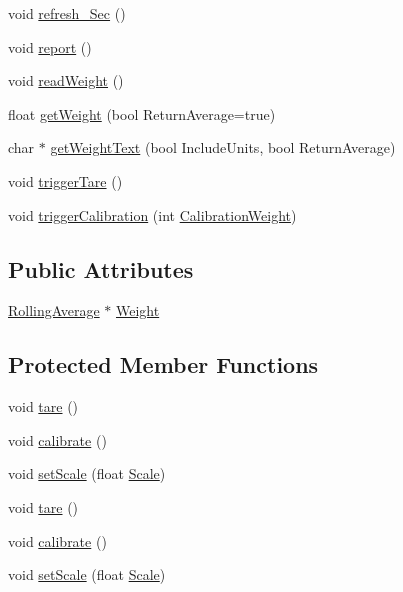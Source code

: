 \begin{DoxyCompactItemize}
\item 
void \hyperlink{class_weight_sensor_a6f7c6cab318b6677e43b7deb9e0b5fee}{refresh\+\_\+\+Sec} ()
\item 
void \hyperlink{class_weight_sensor_a1db622f4f2fb6971d0a4933d825c5c44}{report} ()
\item 
void \hyperlink{class_weight_sensor_ac4a6f05281cc7fa0c602e2f0b2efdbaa}{read\+Weight} ()
\item 
float \hyperlink{class_weight_sensor_a0a42742e1516e6723b1246e789ba9253}{get\+Weight} (bool Return\+Average=true)
\item 
char $\ast$ \hyperlink{class_weight_sensor_a859e380f3bac2453e8659e281b39ce31}{get\+Weight\+Text} (bool Include\+Units, bool Return\+Average)
\item 
void \hyperlink{class_weight_sensor_a54b241f48e63ef6b17eade0d55a78008}{trigger\+Tare} ()
\item 
void \hyperlink{class_weight_sensor_a37b50db6dc60c3bc6a22807af5e17283}{trigger\+Calibration} (int \hyperlink{class_weight_sensor_aed701fda701e06caf8ffdbbe6be8ad10}{Calibration\+Weight})
\end{DoxyCompactItemize}
\subsection*{Public Attributes}
\begin{DoxyCompactItemize}
\item 
\hyperlink{class_rolling_average}{Rolling\+Average} $\ast$ \hyperlink{class_weight_sensor_af53b96a6841dea7a0d04f7206834d09a}{Weight}
\end{DoxyCompactItemize}
\subsection*{Protected Member Functions}
\begin{DoxyCompactItemize}
\item 
void \hyperlink{class_weight_sensor_a02fe54254ed51deefc115fad34053061}{tare} ()
\item 
void \hyperlink{class_weight_sensor_a7718da9f72a6f354ea19550567d42fbf}{calibrate} ()
\item 
void \hyperlink{class_weight_sensor_aa190a87fa5e384d2ead40c99116dc8a7}{set\+Scale} (float \hyperlink{class_weight_sensor_aa009a11ad14eb1d7b9e181e213e737eb}{Scale})
\item 
void \hyperlink{class_weight_sensor_a02fe54254ed51deefc115fad34053061}{tare} ()
\item 
void \hyperlink{class_weight_sensor_a7718da9f72a6f354ea19550567d42fbf}{calibrate} ()
\item 
void \hyperlink{class_weight_sensor_aa190a87fa5e384d2ead40c99116dc8a7}{set\+Scale} (float \hyperlink{class_weight_sensor_aa009a11ad14eb1d7b9e181e213e737eb}{Scale})
\end{DoxyCompactItemize}
